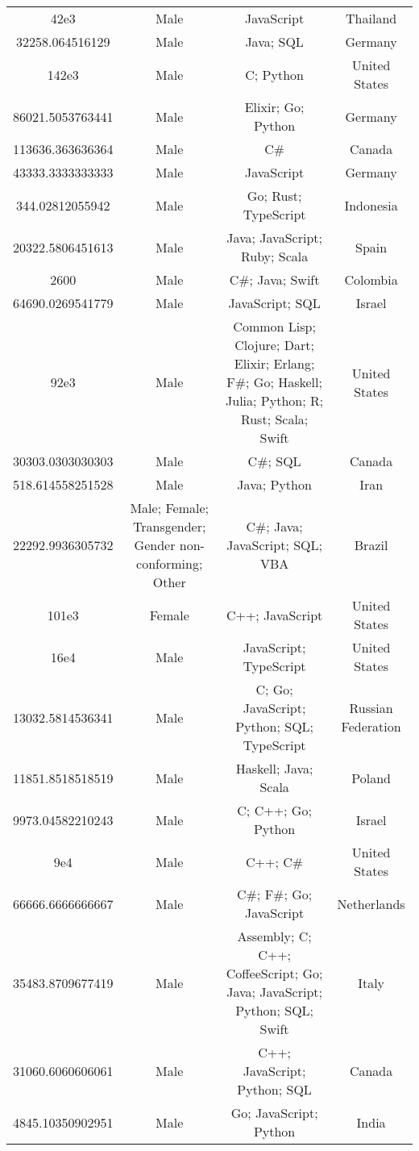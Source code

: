 \begin{center}
\begin{tabular}{ |c|c|c|c| }
42e3  &  Male  &  JavaScript  &  Thailand  \\ 
32258.064516129  &  Male  &  Java; SQL  &  Germany  \\ 
142e3  &  Male  &  C; Python  &  United States  \\ 
86021.5053763441  &  Male  &  Elixir; Go; Python  &  Germany  \\ 
113636.363636364  &  Male  &  C\#  &  Canada  \\ 
43333.3333333333  &  Male  &  JavaScript  &  Germany  \\ 
344.02812055942  &  Male  &  Go; Rust; TypeScript  &  Indonesia  \\ 
20322.5806451613  &  Male  &  Java; JavaScript; Ruby; Scala  &  Spain  \\ 
2600  &  Male  &  C\#; Java; Swift  &  Colombia  \\ 
64690.0269541779  &  Male  &  JavaScript; SQL  &  Israel  \\ 
92e3  &  Male  &  Common Lisp; Clojure; Dart; Elixir; Erlang; F\#; Go; Haskell; Julia; Python; R; Rust; Scala; Swift  &  United States  \\ 
30303.0303030303  &  Male  &  C\#; SQL  &  Canada  \\ 
518.614558251528  &  Male  &  Java; Python  &  Iran  \\ 
22292.9936305732  &  Male; Female; Transgender; Gender non-conforming; Other  &  C\#; Java; JavaScript; SQL; VBA  &  Brazil  \\ 
101e3  &  Female  &  C++; JavaScript  &  United States  \\ 
16e4  &  Male  &  JavaScript; TypeScript  &  United States  \\ 
13032.5814536341  &  Male  &  C; Go; JavaScript; Python; SQL; TypeScript  &  Russian Federation  \\ 
11851.8518518519  &  Male  &  Haskell; Java; Scala  &  Poland  \\ 
9973.04582210243  &  Male  &  C; C++; Go; Python  &  Israel  \\ 
9e4  &  Male  &  C++; C\#  &  United States  \\ 
66666.6666666667  &  Male  &  C\#; F\#; Go; JavaScript  &  Netherlands  \\ 
35483.8709677419  &  Male  &  Assembly; C; C++; CoffeeScript; Go; Java; JavaScript; Python; SQL; Swift  &  Italy  \\ 
31060.6060606061  &  Male  &  C++; JavaScript; Python; SQL  &  Canada  \\ 
4845.10350902951  &  Male  &  Go; JavaScript; Python  &  India  \\ 

\end{tabular}
\end{center}
